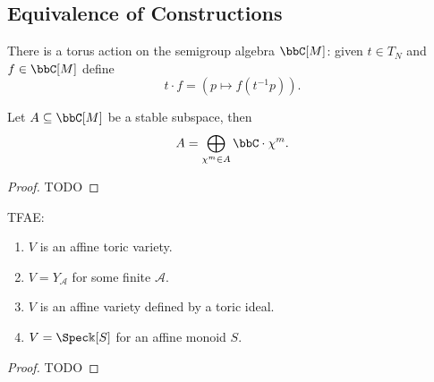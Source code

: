 \subsection{Equivalence of Constructions}


\begin{definition}
  \label{1-1-tor-act-alg}

  There is a torus action on the semigroup algebra $\bbC[M]$: given $t\in T_N$ and $f\in \bbC[M]$ define
  \[
    t \cdot f = (p \mapsto f(t^{-1}p)).
  \]
\end{definition}


\begin{lemma}
  \label{1-1-16-total-red}
    Let $A \subseteq \bbC[M]$ be a stable subspace, then
    \[
      A = \bigoplus_{\chi^m \in A} \bbC \cdot \chi^m.
    \]
\end{lemma}
\begin{proof}

  TODO
\end{proof}


\begin{theorem}
  \label{thm:1-1-17}
  TFAE:
  \begin{enumerate}
    \item $V$ is an affine toric variety.
    \item $V = Y_{\mathcal A}$ for some finite $\mathcal A$.
    \item $V$ is an affine variety defined by a toric ideal.
    \item $V = \Spec \Bbbk[S]$ for an affine monoid $S$.
  \end{enumerate}
\end{theorem}
\begin{proof}

  TODO
\end{proof}
